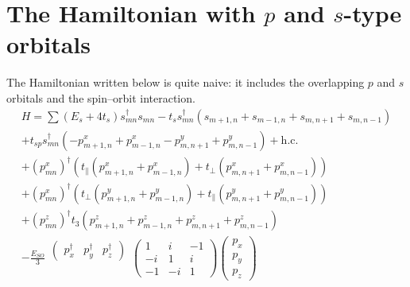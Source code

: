 \section{The Hamiltonian with $p$ and $s$-type orbitals}
The Hamiltonian written below is quite naive: it includes the overlapping $p$ and $s$ orbitals
and the spin--orbit interaction.
\begin{multline}
   H  = \sum (E_s + 4t_s) s_{mn}^{\dagger} s_{mn} - t_s s_{mn}^{\dagger}
                          (s_{m+1,n} + s_{m-1,n} + s_{m,n+1} + s_{m,n-1}) \\
          + t_{sp} s_{mn}^{\dagger} (-p_{m+1,n}^x + p_{m-1,n}^x - p^y_{m,n+1} + p^y_{m,n-1})
                                                                + \mathrm{h.c.}  \\
          + (p_{mn}^x)^{\dagger}(t_{\parallel}(p_{m+1,n}^x + p_{m-1,n}^x) +
                                 t_{\perp} (p^x_{m,n+1} + p^x_{m,n-1})) \\
          + (p_{mn}^x)^{\dagger}(t_{\perp}(p_{m+1,n}^y + p_{m-1,n}^y) +
                                 t_{\parallel} (p^y_{m,n+1} + p^y_{m,n-1})) \\
          + (p_{mn}^z)^{\dagger} t_3 (p_{m+1,n}^z + p_{m-1,n}^z +
                                p^z_{m,n+1} + p^z_{m,n-1}) \\
          -\frac{E_{SO}}{3}
                \begin{matrix}
                    \left(\begin{matrix}
                        p_x^\dagger & p_y^\dagger & p_z^\dagger
                    \end{matrix}\right) \\
                    \\
                    \\
                \end{matrix}
        		\left(\begin{matrix}
        			1 & i & -1 \\
        			-i & 1 & i \\
        			-1 & -i & 1
        		\end{matrix} \right)
                \left(\begin{matrix}
                    p_x \\ 
                    p_y \\
                    p_z
                \end{matrix}\right)
\end{multline}
